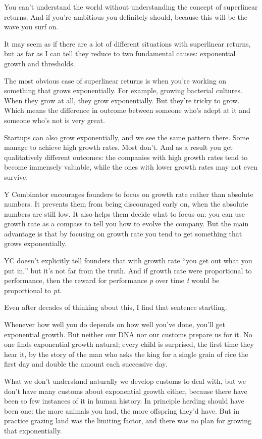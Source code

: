 \documentclass[12pt]{book}
\begin{document}
You can't understand the world without understanding the concept of
superlinear returns. And if you're ambitious you definitely should,
because this will be the wave you surf on.

It may seem as if there are a lot of different situations with
superlinear returns, but as far as I can tell they reduce to two
fundamental causes: exponential growth and thresholds.

The most obvious case of superlinear returns is when you're working on
something that grows exponentially. For example, growing bacterial
cultures. When they grow at all, they grow exponentially. But they're
tricky to grow. Which means the difference in outcome between someone
who's adept at it and someone who's not is very great.

Startups can also grow exponentially, and we see the same pattern there.
Some manage to achieve high growth rates. Most don't. And as a result
you get qualitatively different outcomes: the companies with high growth
rates tend to become immensely valuable, while the ones with lower
growth rates may not even survive.

Y Combinator encourages founders to focus on growth rate rather than
absolute numbers. It prevents them from being discouraged early on, when
the absolute numbers are still low. It also helps them decide what to
focus on: you can use growth rate as a compass to tell you how to evolve
the company. But the main advantage is that by focusing on growth rate
you tend to get something that grows exponentially.

YC doesn't explicitly tell founders that with growth rate ``you get out
what you put in,'' but it's not far from the truth. And if growth rate
were proportional to performance, then the reward for performance
\emph{p} over time \emph{t} would be proportional to \emph{pt}.

Even after decades of thinking about this, I find that sentence
startling.

Whenever how well you do depends on how well you've done, you'll get
exponential growth. But neither our DNA nor our customs prepare us for
it. No one finds exponential growth natural; every child is surprised,
the first time they hear it, by the story of the man who asks the king
for a single grain of rice the first day and double the amount each
successive day.

What we don't understand naturally we develop customs to deal with, but
we don't have many customs about exponential growth either, because
there have been so few instances of it in human history. In principle
herding should have been one: the more animals you had, the more
offspring they'd have. But in practice grazing land was the limiting
factor, and there was no plan for growing that exponentially.
\end{document}
